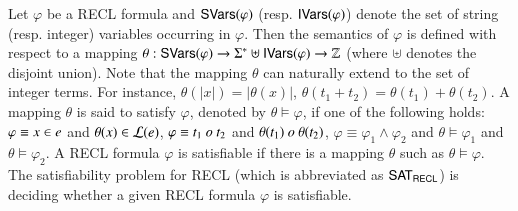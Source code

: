 Let $\varphi$ be a RECL formula and ${\sf SVars}(\varphi)$ (resp. ${\sf IVars}(\varphi)$) denote the set of string (resp. integer) variables occurring in $\varphi$. 
%
Then the semantics of  $\varphi$ is defined with respect to a mapping $\theta: {\sf SVars}(\varphi) \rightarrow \Sigma^* \uplus {\sf IVars}(\varphi) \rightarrow \mathbb{Z}$ (where $\uplus$ denotes the disjoint union). 
Note that the mapping $\theta$ can naturally extend to the set of integer terms. For instance, $\theta(|x|) =|\theta(x)|$, $\theta(t_1 + t_2) = \theta(t_1) + \theta(t_2)$. 
A  mapping $\theta$ is said to satisfy $\varphi$, denoted by $\theta \models \varphi$, if one of the following holds: 
$\varphi \equiv x \in e$ and $\theta(x) \in \mathcal{L}(e)$, 
%
$\varphi \equiv t_1\ \op\ t_2$ and $\theta(t_1)\ \op\ \theta(t_2)$, 
%
$\varphi \equiv \varphi_1 \wedge \varphi_2$ and $\theta \models \varphi_1$ and $\theta \models \varphi_2$.
A RECL formula $\varphi$ is satisfiable if there is a mapping $\theta$ such as $\theta \models \varphi$. The satisfiability problem for RECL (which is abbreviated as ${\sf SAT_{RECL}}$) is deciding whether a given RECL formula $\varphi$ is satisfiable. 
